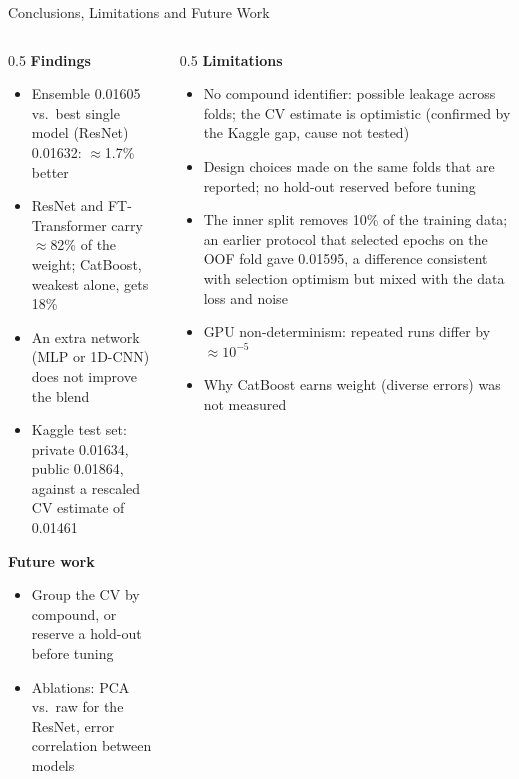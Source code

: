 \documentclass[9pt,aspectratio=169]{beamer}
\begin{document}
\begin{frame}{Conclusions, Limitations and Future Work}
  \small
  \begin{columns}[T]
    \begin{column}{0.5\textwidth}
      \textbf{Findings}
      \begin{itemize}
        \item Ensemble 0.01605 vs.\ best single model (ResNet) 0.01632: $\approx$1.7\% better
        \item ResNet and FT-Transformer carry $\approx$82\% of the weight; CatBoost, weakest alone, gets 18\%
        \item An extra network (MLP or 1D-CNN) does not improve the blend
        \item Kaggle test set: private 0.01634, public 0.01864, against a rescaled CV estimate of 0.01461
      \end{itemize}
      \textbf{Future work}
      \begin{itemize}
        \item Group the CV by compound, or reserve a hold-out before tuning
        \item Ablations: PCA vs.\ raw for the ResNet, error correlation between models
      \end{itemize}
    \end{column}
    \begin{column}{0.5\textwidth}
      \textbf{Limitations}
      \begin{itemize}
        \item No compound identifier: possible leakage across folds; the CV estimate is optimistic (confirmed by the Kaggle gap, cause not tested)
        \item Design choices made on the same folds that are reported; no hold-out reserved before tuning
        \item The inner split removes 10\% of the training data; an earlier protocol that selected epochs on the OOF fold gave 0.01595, a difference consistent with selection optimism but mixed with the data loss and noise
        \item GPU non-determinism: repeated runs differ by $\approx 10^{-5}$
        \item Why CatBoost earns weight (diverse errors) was not measured
      \end{itemize}
    \end{column}
  \end{columns}
\end{frame}
\end{document}

